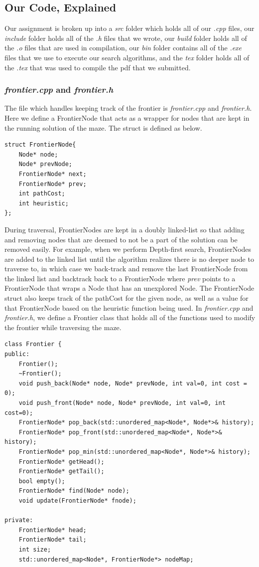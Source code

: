 \documentclass[titlepage]{article}
\begin{document}
\subsection{Our Code, Explained}
Our assignment is broken up into a \textit{src} folder which holds all of our \textit{.cpp} files, our \textit{include} folder holds all of the \textit{.h} files that we wrote, our \textit{build} folder holds all of the \textit{.o} files that are used in compilation, our \textit{bin} folder contains all of the \textit{.exe} files that we use to execute our search algorithms, and the \textit{tex} folder holds all of the \textit{.tex} that was used to compile the pdf that we submitted. 
\subsubsection{\textit{frontier.cpp} and \textit{frontier.h}}
The file which handles keeping track of the frontier is \textit{frontier.cpp} and \textit{frontier.h}. Here we define a FrontierNode that acts as a wrapper for nodes that are kept in the running solution of the maze. The struct is defined as below.

\begin{lstlisting}
struct FrontierNode{
    Node* node;
    Node* prevNode;
    FrontierNode* next;
    FrontierNode* prev;
    int pathCost;
    int heuristic;
};
\end{lstlisting}

During traversal, FrontierNodes are kept in a doubly linked-list so that adding and removing nodes that are deemed to not be a part of the solution can be removed easily. For example, when we perform Depth-first search, FrontierNodes are added to the linked list until the algorithm realizes there is no deeper node to traverse to, in which case we back-track and remove the last FrontierNode from the linked list and backtrack back to a FrontierNode where \textit{prev} points to a FrontierNode that wraps a Node that has an unexplored Node. The FrontierNode struct also keeps track of the pathCost for the given node, as well as a value for that FrontierNode based on the heuristic function being used. In \textit{frontier.cpp} and \textit{frontier.h}, we define a Frontier class that holds all of the functions used to modify the frontier while traversing the maze. 

\begin{lstlisting}
class Frontier {
public:
    Frontier();
    ~Frontier();
    void push_back(Node* node, Node* prevNode, int val=0, int cost = 0);
    void push_front(Node* node, Node* prevNode, int val=0, int cost=0);
    FrontierNode* pop_back(std::unordered_map<Node*, Node*>& history);
    FrontierNode* pop_front(std::unordered_map<Node*, Node*>& history);
    FrontierNode* pop_min(std::unordered_map<Node*, Node*>& history);
    FrontierNode* getHead();
    FrontierNode* getTail();
    bool empty();
    FrontierNode* find(Node* node);
    void update(FrontierNode* fnode);

private:
    FrontierNode* head;
    FrontierNode* tail;
    int size;
    std::unordered_map<Node*, FrontierNode*> nodeMap;
\end{lstlisting}
\end{document}
